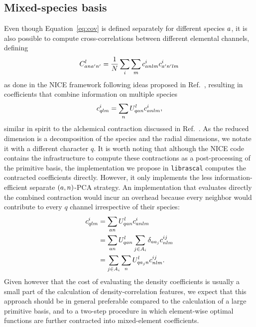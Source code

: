 
\subsection{Mixed-species basis}

Even though Equation~\eqref{eq:cov} is defined separately for different species $a$, it is also possible to compute cross-correlations between different elemental channels, defining
\begin{equation}
  C^{l}_{a na' n'}= \frac{1}{N} \sum_i \sum_m c^i_{a nlm}c^i_{a^\prime n^\prime lm} 
\label{eq:cov-multispecies}
\end{equation}
as done in the NICE framework\cite{niga+20jcp} following ideas proposed in Ref.~, resulting in coefficients that combine information on multiple species
\begin{equation}
  c^i_{qlm} = \sum_n U^{l}_{qa n} c^i_{a nlm}, \label{eq:contract-multispecies}
\end{equation}
similar in spirit to the alchemical contraction discussed in Ref.~.
As the reduced dimension is a decomposition of the species and the radial dimensions, we notate it with a different character $q$.
It is worth noting that although the NICE code\cite{NICE-REPO} contains the infrastructure to compute these contractions as a post-processing of the primitive basis, the implementation we propose in \texttt{librascal}\cite{LIBRASCAL} computes the contracted coefficients directly. However, it only implements the less information-efficient separate $(a, n)$-PCA strategy.
An implementation that evaluates directly the combined contraction would incur an overhead because every neighbor would contribute to every $q$ channel irrespective of their species:
\begin{align}
  c^i_{qlm}  &= \sum_{a n} U^l_{q a n} c^{i}_{a nlm} \\
             &= \sum_{a n} U^l_{q a n} \sum_{j\in A_i} \delta_{a a_j} c^{ij}_{nlm} \\
             &= \sum_{j\in A_i} \sum_{n} U^l_{q a_j n} c^{ij}_{nlm}.
\end{align}
Given however that the cost of evaluating the density coefficients is usually a small part of the calculation of density-correlation features\cite{caro2019optimizing,musil2021efficient}, we expect that this approach should be in general preferable compared to the calculation of a large primitive basis, and to a two-step procedure in which element-wise optimal functions are further contracted into mixed-element coefficients.

